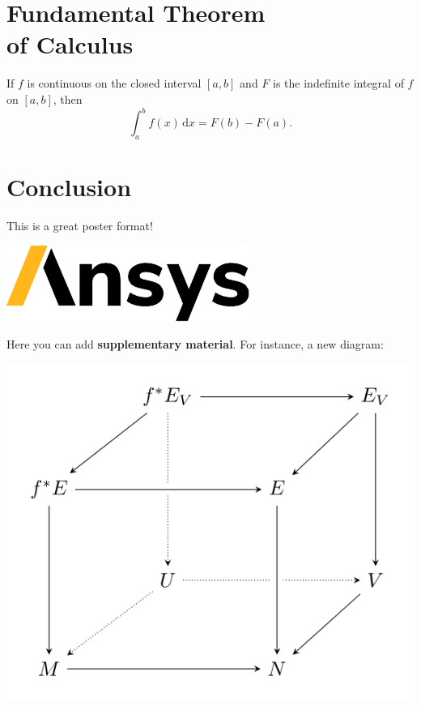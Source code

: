 \documentclass[a0paper,fleqn]{src/betterposter}
\begin{document}
{\section{Fundamental Theorem\\of Calculus}
If $f$ is continuous on the closed interval $[a,b]$ and $F$ is the indefinite integral of $f$ on $[a,b]$, then
\begin{equation}
\int_a^b f(x)\,\mathrm{d}x = F(b)-F(a).
\end{equation}

\section{Conclusion}
This is a great poster format!

\vfill

\includegraphics[width=\textwidth]{img/example/ansys_logo_white}\\

}{

Here you can add \textbf{supplementary material}. For instance, a new diagram:
\begin{center}
\includegraphics[width=\textwidth]{img/example/tikzexample2}
\end{center}

}
\end{document}
